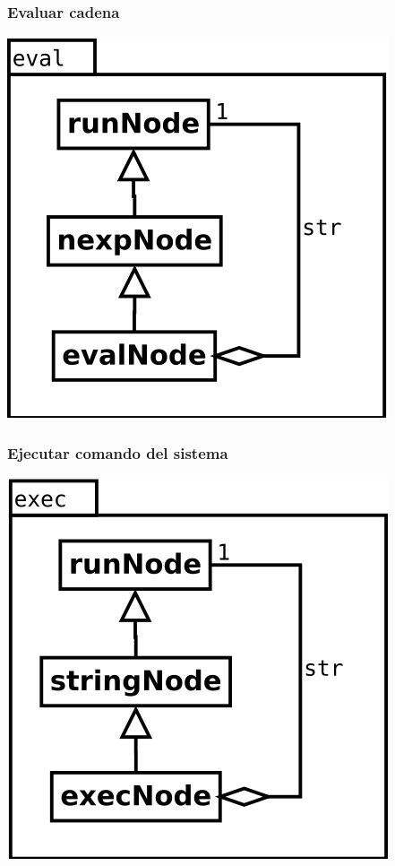 \begin{multicols}{2}
   \subsubsection {Evaluar cadena} 
   \begin{center}
   \includegraphics[scale=0.4]{eval.png} \\
   \end{center}
\columnbreak
   \subsubsection {Ejecutar comando del sistema} 
   \begin{center}
   \includegraphics[scale=0.4]{exec.png} \\
   \end{center}
\end{multicols}


